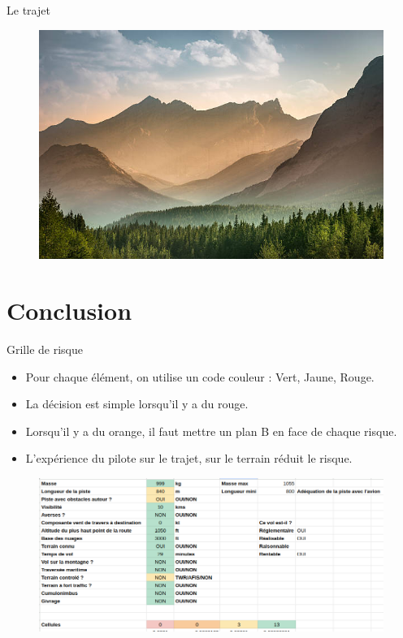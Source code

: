 \documentclass{beamer}
\begin{document}
\begin{frame}{Le trajet}
  \begin{figure}
    \centering
    \includegraphics[scale=1.7]{images/montagnes.jpg}
  \end{figure}
\end{frame}


\section{Conclusion}
\begin{frame}{Grille de risque}
  \begin{itemize}
    \item Pour chaque élément, on utilise un code couleur : Vert, Jaune, Rouge. \pause
    \item La décision est simple lorsqu'il y a du rouge. \pause
    \item Lorsqu'il y a du orange, il faut mettre un plan B en face de chaque risque. \pause
    \item L'expérience du pilote sur le trajet, sur le terrain réduit le risque.
  \end{itemize}
  \pause
  \begin{figure}
    \centering
    \includegraphics[scale=0.7]{images/tableau-risques.png}
  \end{figure}

\end{frame}
\end{document}
